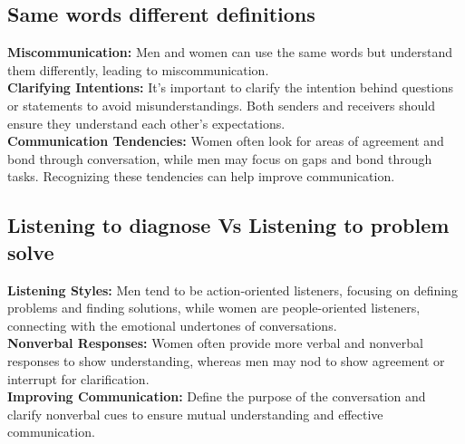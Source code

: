 \documentclass[12pt]{article}
\begin{document}
\subsection{Same words different definitions}

\textbf{Miscommunication:}  Men and women can use the same words but understand them differently, leading to miscommunication.\\
\textbf{Clarifying Intentions:}  It's important to clarify the intention behind questions or statements to avoid misunderstandings. Both senders and receivers should ensure they understand each other's expectations.\\
\textbf{Communication Tendencies:}  Women often look for areas of agreement and bond through conversation, while men may focus on gaps and bond through tasks. Recognizing these tendencies can help improve communication.

\subsection{Listening to diagnose Vs Listening to problem solve}
\textbf{Listening Styles:}  Men tend to be action-oriented listeners, focusing on defining problems and finding solutions, while women are people-oriented listeners, connecting with the emotional undertones of conversations.\\
\textbf{Nonverbal Responses:}  Women often provide more verbal and nonverbal responses to show understanding, whereas men may nod to show agreement or interrupt for clarification.\\
\textbf{Improving Communication:}  Define the purpose of the conversation and clarify nonverbal cues to ensure mutual understanding and effective communication.
\end{document}
